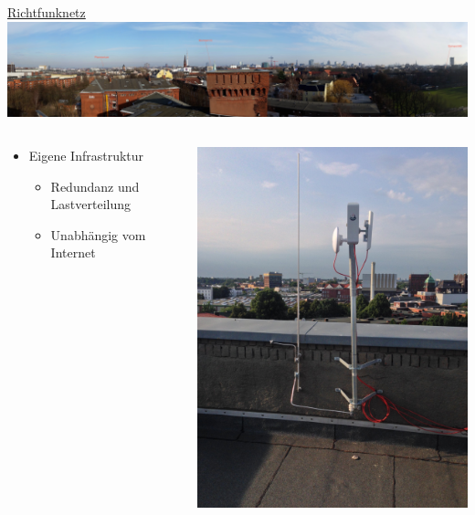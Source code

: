\documentclass[t]{beamer}
\begin{document}
  \begin{frame}{\href{http://wiki.freifunk.net/Freifunk_Hamburg/Richtfunknetz}{Richtfunknetz}}
    \includegraphics[width=\textwidth]{Bilder/fux}
    \begin{columns}
      \begin{column}{0.7\textwidth}
	\begin{itemize}
	  \item Eigene Infrastruktur
	  \begin{itemize}
	    \item Redundanz und Lastverteilung 
	    \item Unabhängig vom Internet
	  \end{itemize}
	\end{itemize}
      \end{column}
      \begin{column}{0.3\textwidth}
	\begin{center}
	  \includegraphics[width=.9\textwidth]{Bilder/richtfunkmast}
	\end{center}
      \end{column}
    \end{columns}
  \end{frame}
  
\end{document}
